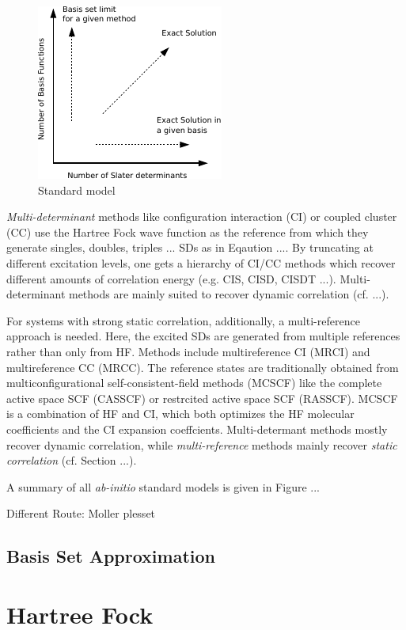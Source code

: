 \begin{figure}
\centering
\includegraphics[scale=2.0]{Pics/standardmodel}
\caption{Standard model}
\end{figure}

\emph{Multi-determinant} methods like configuration interaction (CI) or coupled cluster (CC) use the Hartree Fock wave function as the reference from which they generate singles, doubles, triples ... SDs  as in Eqaution .... By truncating at different excitation levels, one gets a hierarchy of CI/CC methods which recover different amounts of correlation energy (e.g. CIS, CISD, CISDT ...). Multi-determinant methods are mainly suited to recover dynamic correlation (cf. ...).

For systems with strong static correlation, additionally, a multi-reference approach is needed. Here, the excited SDs are generated from multiple references rather than only from HF. Methods include multireference CI (MRCI) and multireference CC (MRCC). The reference states are traditionally obtained from multiconfigurational self-consistent-field methods (MCSCF) like the complete active space SCF (CASSCF) or restrcited active space SCF (RASSCF). MCSCF is a combination of HF and CI, which both optimizes the HF molecular coefficients and the CI expansion coeffcients. Multi-determant methods mostly recover dynamic correlation, while \emph{multi-reference} methods mainly recover \emph{static correlation} (cf. Section ...). 

A summary of all \emph{ab-initio} standard models is given in Figure ...

Different Route: Moller plesset

\subsection{Basis Set Approximation}

\section{Hartree Fock}

